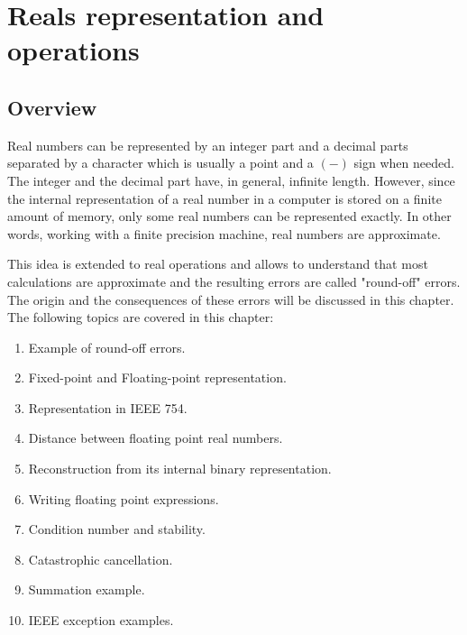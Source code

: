 \renewcommand\home{./Fortran_project/sources/IEEE}


%


\chapter{Reals representation and operations} \label{chap:reals}


    \section*{Overview}

Real numbers can be represented by 
an integer part and a decimal parts separated by a character which is usually a point 
and a $(-)$ sign when needed. 
The integer and the decimal part have, in general, infinite length.  
However, since the internal representation of a real number 
in a computer  is stored on a finite amount of memory, 
only some real numbers can be represented exactly. 
In other words, working with a finite precision machine, real numbers are approximate.

This idea is extended to real operations and allows to understand that most calculations 
are approximate and the resulting errors are called "round-off" errors. 
The origin and the consequences of these errors will be discussed in this chapter. 
The following topics are covered in this chapter: 

\begin{enumerate} 
    \setlength\itemsep{-0.1cm}
    \item Example of round-off errors. 
    \item Fixed-point and Floating-point representation.
    \item Representation in IEEE 754.
    \item Distance between floating point real numbers.
    \item Reconstruction from its internal binary representation.
    \item Writing floating point expressions.
    \item Condition number and stability.
    \item Catastrophic cancellation.
    \item Summation example.
    \item IEEE exception examples.
\end{enumerate} 

